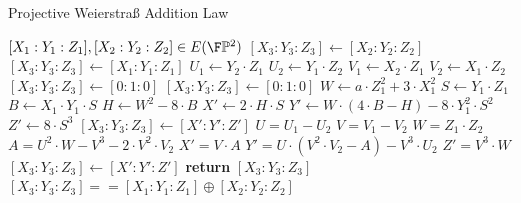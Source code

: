 \begin{algorithm}\caption{Projective Weierstraß Addition Law}
\label{alg_projective_group_law}
\begin{algorithmic}[0]
\Require $[X_1:Y_1:Z_1],[X_2:Y_2:Z_2] \in E(\F\mathbb{P}^2)$
\If{$[X_1:Y_1:Z_1] == [0:1:0]$}
  \State $[X_3:Y_3:Z_3] \gets [X_2:Y_2:Z_2]$
\ElsIf{$[X_2:Y_2:Z_2] == [0:1:0]$}
  \State $[X_3:Y_3:Z_3] \gets [X_1:Y_1:Z_1]$
\Else
  \State $U_1 \gets Y_2\cdot Z_1$
  \State $U_2 \gets Y_1\cdot Z_2$
  \State $V_1 \gets X_2\cdot Z_1$
  \State $V_2 \gets X_1\cdot Z_2$
      $[X_3:Y_3:Z_3] \gets [0:1:0]$
    \Else
        $[X_3:Y_3:Z_3] \gets [0:1:0]$
      \Else
        \State $W \gets a\cdot Z_1^2 + 3\cdot X_1^2$
        \State $S \gets Y_1\cdot Z_1$
        \State $B \gets X_1\cdot Y_1\cdot S$
        \State $H \gets W^2 - 8\cdot B$
        \State $X' \gets 2\cdot H\cdot S$
        \State $Y' \gets W\cdot (4\cdot B - H) - 8\cdot Y_1^2\cdot S^2$
        \State $Z' \gets 8\cdot S^3$
        \State $[X_3:Y_3:Z_3] \gets [X':Y':Z']$
      \EndIf
    \EndIf
  \Else
    \State $U = U_1 - U_2$
    \State $V = V_1 - V_2$
    \State $W = Z_1\cdot Z_2$
    \State $A = U^2\cdot W - V^3 - 2\cdot V^2\cdot V_2$
    \State $X' = V\cdot A$
    \State $Y' = U\cdot(V^2\cdot V_2 - A) - V^3\cdot U_2$
    \State $Z' = V^3\cdot W$
    \State $[X_3:Y_3:Z_3]\gets [X':Y':Z']$
  \EndIf
\EndIf
\State \textbf{return} $[X_3:Y_3:Z_3]$
\EndProcedure
\Ensure $ [X_3:Y_3:Z_3] == [X_1:Y_1:Z_1] \oplus [X_2:Y_2:Z_2]$
\end{algorithmic}
\end{algorithm}


